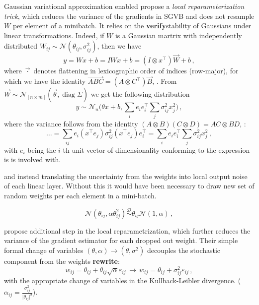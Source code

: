 \documentclass[a4paper,10pt]{article}
\newcommand{\important}[1]{\textbf{\color{red} #1}}
\newcommand{\verify}{\important{verify}}
\newcommand{\rewrite}{\important{rewrite}}
\renewcommand{\vec}{\overrightarrow}
\begin{document}
Gaussian variational approximation enabled \cite{kingma_variational_2015} propose a
\textit{local reparameterization trick}, which reduces the variance of the gradients
in SGVB and does not resample $W$ per element of a minibatch. It relies on the \verify{stability}
of Gaussians under linear transformations. Indeed, if $W$ is a Gaussian martrix with
independently distributed $
  W_{ij} \sim \mathcal{N}(\theta_{ij}, \sigma^2_{ij})
$, then we have
$$
y = W x + b
  = I W x + b
  = (I \otimes x^\top) \vec{W} + b
  \,, $$
where $\vec{\cdot}$ denotes flattening in lexicographic order of indices (row-major),
for which we have the identity $\vec{A B C} = (A \otimes C^\top) \vec{B}$, \cite{cookbook2012}.
From $\vec{W} \sim \mathcal{N}_{[n\times m]}(\vec{\theta}, \mathop{diag}\Sigma)$ we get
the following distribution
$$
y \sim \mathcal{N}_{n}
  \bigl(
    \theta x + b,
    \sum_{i} e_i e_i^\top \sum_j \sigma^2_{ij} x_j^2
  \bigr)
  \,, $$
where the variance follows from the identity $(A\otimes B) (C\otimes D) = AC\otimes BD$,
\cite{cookbook2012}:
$$
\ldots
  = \sum_{ij} e_i (x^\top e_j) \sigma^2_{ij} (x^\top e_j) e_i^\top
  = \sum_{i} e_i e_i^\top \sum_j \sigma^2_{ij} x_j^2
  \,, $$
with $e_i$ being the $i$-th unit vector of dimensionality conforming to the expression
is is involved with.


and instead
translating the uncertainty from the weights into local output noise of each linear layer.
Without this it would have been necessary to draw new set of random weights per each element
in a mini-batch.

$$
  \mathcal{N}(\theta_{ij}, \alpha \theta^2_{ij})
  \overset{\mathcal{D}}{\sim}
  \theta_{ij} \mathcal{N}(1, \alpha)
  \,, $$

\cite{molchanov_variational_2017} propose additional step in the local reparametrization,
which further reduces the variance of the gradient estimator for each dropped out
weight. Their simple formal change of variables $(\theta, \alpha) \to (\theta, \sigma^2)$
decouples the stochastic component from the weights \rewrite:
$$
  w_{ij} = \theta_{ij} + \theta_{ij} \sqrt{\alpha} \varepsilon_{ij}
  \,\to\,
  w_{ij} = \theta_{ij} + \sigma^2_{ij} \varepsilon_{ij}
  \,, $$
with the appropriate change of variables in the Kullback-Leibler divergence.
($\alpha_{ij} = \tfrac{\sigma_{ij}^2}{\lvert \theta_{ij}\rvert^2}$).
\end{document}
